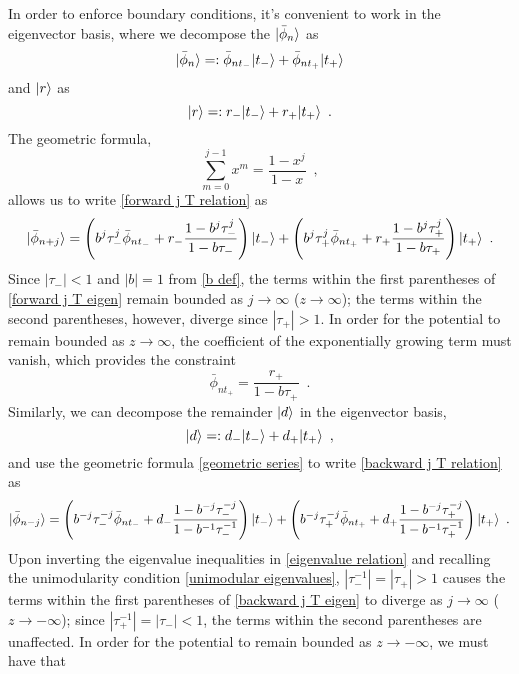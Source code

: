 \documentclass{article}
\begin{document}
In order to enforce boundary conditions, it's convenient to work in the eigenvector basis, where we decompose the $\lvert\bar\phi_n\rangle$ as
\begin{equation}
    \label{eigen decomp phi}
    \lvert\bar\phi_n\rangle=:\bar\phi_{n t_-}\lvert t_-\rangle + \bar\phi_{nt_+}\lvert t_+\rangle
\end{equation}
and $\lvert r\rangle$ as
\begin{equation}
    \label{eigen decomp r}
    \lvert r\rangle =: r_-\lvert t_-\rangle+r_+\lvert t_+\rangle
    \,\,\,.
\end{equation}
The geometric formula,
\begin{equation}
    \label{geometric series}
    \sum_{m=0}^{j-1} x^m = \frac{1-x^j}{1-x}
    \,\,\,,
\end{equation}
allows us to write \eqref{forward j T relation} as
\begin{equation}
    \label{forward j T eigen}
    \lvert\bar\phi_{n+j}\rangle = 
    \left( 
    b^j \tau_-^j\bar\phi_{nt_-} + r_-\frac{1-b^j\tau_-^j}{1-b\tau_-}
    \right)\lvert t_-\rangle
    +
    \left(
    b^j\tau_+^j\bar\phi_{nt_+}+r_+\frac{1-b^j\tau_+^j}{1-b\tau_+}
    \right)\lvert t_+\rangle
    \,\,\,.
\end{equation}
Since $|\tau_-|<1$ and $|b|=1$ from \eqref{b def}, the terms within the first parentheses of \eqref{forward j T eigen} remain bounded as $j\to\infty$ ($z\to\infty$); the terms within the second parentheses, however, diverge since $|\tau_+|>1$.  In order for the potential to remain bounded as $z\to\infty$, the coefficient of the exponentially growing term must vanish, which provides the constraint
\begin{equation}
    \label{forward BC}
    \bar\phi_{nt_+}=\frac{r_+}{1-b\tau_+}
    \,\,\,.
\end{equation}
Similarly, we can decompose the remainder $\lvert d\rangle$ in the eigenvector basis,
\begin{equation}
    \label{eigen decomp d}
    \lvert d\rangle=:d_-\lvert t_-\rangle + d_+\lvert t_+\rangle
    \,\,\,,
\end{equation}
and use the geometric formula \eqref{geometric series} to write \eqref{backward j T relation} as
\begin{equation}
    \label{backward j T eigen}
    \lvert\bar\phi_{n-j}\rangle = 
    \left(
    b^{-j}\tau_-^{-j}\bar\phi_{nt_-} + d_- \frac{1-b^{-j}\tau_-^{-j}}{1-b^{-1}\tau_-^{-1}}
    \right)
    \lvert t_-\rangle
    +
    \left(
    b^{-j}\tau_+^{-j}\bar\phi_{nt_+}
    +
    d_+\frac{1-b^{-j}\tau_+^{-j}}{1-b^{-1}\tau_+^{-1}}
    \right)
    \lvert t_+\rangle
    \,\,\,.
\end{equation}
Upon inverting the eigenvalue inequalities in \eqref{eigenvalue relation} and recalling the unimodularity condition \eqref{unimodular eigenvalues}, $|\tau_-^{-1}|=|\tau_+|>1$ causes the terms within the first parentheses of \eqref{backward j T eigen} to diverge as $j\to\infty$ ($z\to-\infty$); since $|\tau_+^{-1}|=|\tau_-|<1$, the terms within the second parentheses are unaffected.  In order for the potential to remain bounded as $z\to-\infty$, we must have that
\end{document}
